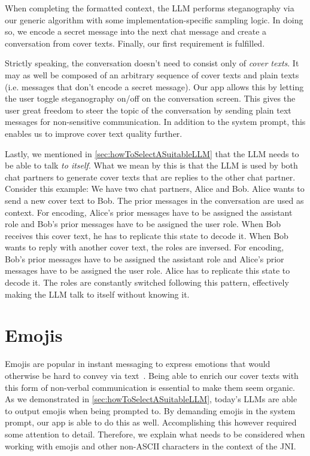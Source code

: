 When completing the formatted context, the \gls{LLM} performs steganography via our generic algorithm with some implementation-specific sampling logic. In doing so, we encode a secret message into the next chat message and create a conversation from cover texts. Finally, our first requirement is fulfilled.

Strictly speaking, the conversation doesn't need to consist only of \textit{cover texts}. It may as well be composed of an arbitrary sequence of cover texts and plain texts (i.e. messages that don't encode a secret message). Our app allows this by letting the user toggle steganography on/off on the conversation screen. This gives the user great freedom to steer the topic of the conversation by sending plain text messages for non-sensitive communication. In addition to the system prompt, this enables us to improve cover text quality further.

Lastly, we mentioned in \cref{sec:howToSelectASuitableLLM} that the \gls{LLM} needs to be able to talk \textit{to itself}. What we mean by this is that the \gls{LLM} is used by both chat partners to generate cover texts that are replies to the other chat partner. Consider this example: We have two chat partners, Alice and Bob. Alice wants to send a new cover text to Bob. The prior messages in the conversation are used as context. For encoding, Alice's prior messages have to be assigned the assistant role and Bob's prior messages have to be assigned the user role. When Bob receives this cover text, he has to replicate this state to decode it. When Bob wants to reply with another cover text, the roles are inversed. For encoding, Bob's prior messages have to be assigned the assistant role and Alice's prior messages have to be assigned the user role. Alice has to replicate this state to decode it. The roles are constantly switched following this pattern, effectively making the \gls{LLM} talk to itself without knowing it.

\section{Emojis}
\label{sec:emojis}
Emojis are popular in instant messaging to express emotions that would otherwise be hard to convey via text~\cite{zhouGoodbyeTextHello2017}. Being able to enrich our cover texts with this form of non-verbal communication is essential to make them seem organic. As we demonstrated in \cref{sec:howToSelectASuitableLLM}, today's \glspl{LLM} are able to output emojis when being prompted to. By demanding emojis in the system prompt, our app is able to do this as well. Accomplishing this however required some attention to detail. Therefore, we explain what needs to be considered when working with emojis and other non-ASCII characters in the context of the \gls{JNI}.

